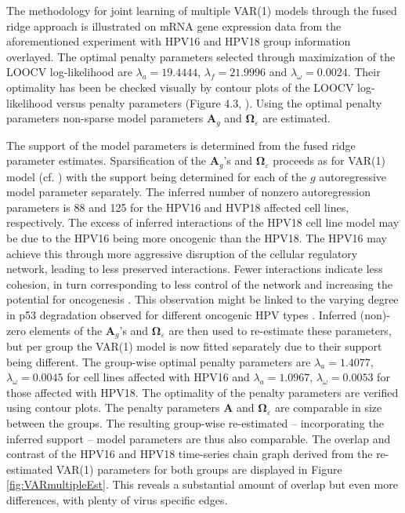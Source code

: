 The methodology for joint learning of multiple VAR(1) models through the fused ridge approach is illustrated on mRNA gene expression data from the aforementioned experiment with HPV16 and HPV18 group information overlayed. The optimal penalty parameters selected through maximization of the LOOCV log-likelihood are $\lambda_a=19.4444$, $\lambda_f=21.9996$ and $\lambda_{\omega}=0.0024$. Their optimality has been be checked visually by contour plots of the LOOCV log-likelihood versus penalty parameters (Figure 4.3, \cite{Supp2018}). Using the optimal penalty parameters non-sparse model parameters $\mathbf{A}_g$ and $\boldsymbol{\Omega}_{\varepsilon}$ are estimated.


The support of the model parameters is determined from the fused ridge parameter estimates. Sparsification of the $\mathbf{A}_g$'s and $\boldsymbol{\Omega}_{\varepsilon}$ proceeds as for VAR(1) model (cf. \cite{Miok2017}) with the support being determined for each of the $g$ autoregressive model parameter separately. The inferred number of nonzero autoregression parameters is 88 and 125 for the HPV16 and HVP18 affected cell lines, respectively. The excess of inferred interactions of the HPV18 cell line model may be due to the HPV16 being more oncogenic than the HPV18. The HPV16 may achieve this through more aggressive disruption of the cellular regulatory network, leading to less preserved interactions. Fewer interactions indicate less cohesion, in turn corresponding to less control of the network and increasing the potential for oncogenesis \citep{Wieringen2015}. This observation might be linked to the varying degree in p53 degradation observed for different oncogenic HPV types \citep{Schutze2014}. Inferred (non)-zero elements of the $\mathbf{A}_g$'s and $\boldsymbol{\Omega}_{\varepsilon}$ are then used to re-estimate these parameters, but per group the VAR(1) model is now fitted separately due to their support being different. The group-wise optimal penalty parameters are $\lambda_{a}=1.4077$, $\lambda_{\omega}=0.0045$ for cell lines affected with HPV16 and $\lambda_{a}=1.0967$, $\lambda_{\omega}= 0.0053$ for those affected with HPV18. The optimality of the penalty parameters are verified using contour plots. The penalty parameters $\mathbf{A}$ and $\mathbf{\Omega}_{\varepsilon}$ are comparable in size between the groups. The resulting group-wise re-estimated -- incorporating the inferred support -- model parameters are thus also comparable. The overlap and contrast of the HPV16 and HPV18 time-series chain graph derived from the re-estimated VAR(1) parameters for both groups are displayed in Figure \ref{fig:VARmultipleEst}. This reveals a substantial amount of overlap but even more differences, with plenty of virus specific edges. 

